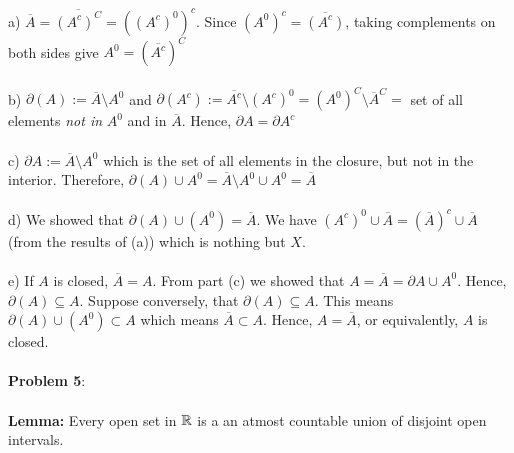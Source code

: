 \documentclass[../Main.tex]{subfiles}
\begin{document}
a) $\overline{A}=\overline{(A^c)^C}=((A^c)^0)^c$. Since $(A^0)^c=\overline{(A^c)}$, taking complements on both sides give $A^0=(\overline{A^c})^C$
\\\\ b) $\partial (A):= \overline{A}\setminus{A^0}$ and
$\partial(A^c):=\overline{A^c}\setminus{(A^c)^0}=(A^0)^C \setminus{\overline{A}^C}=$ set of all elements \emph{not in } $A^0$ and in $\overline{A}$. Hence, $\partial{A}=\partial{A^c}$
\\\\ c) $\partial{A}:= \overline{A} \setminus{A^0}$ which is the set of all elements in the closure, but not in the interior. Therefore, $\partial(A) \cup A^0= \overline{A} \setminus{A^0} \cup A^0=\overline{A}$
\\\\ d) We showed that $\partial(A)\cup(A^0)=\overline{A}$. We have $(A^c)^0 \cup \overline{A}=(\overline{A})^c \cup \overline{A}$ (from the results of (a)) which is nothing but $X$. 
\\\\  e) If $A$ is closed, $\overline{A}=A$. From part (c)
 we showed that $A=\overline{A}=\partial{A} \cup A^0$. Hence, $\partial(A) \subseteq A$. 
 Suppose conversely, that $\partial(A) \subseteq A$. This means $\partial(A)\cup(A^0)\subset A$ which means $\overline{A} \subset A$. Hence, $A=\overline{A}$, or equivalently, $A$ is closed.
 \\\\ \textbf{Problem 5}:
 \\\\ \textbf{Lemma:} Every open set in $\mathbb R$ is a an atmost countable union of disjoint open intervals.
\end{document}
